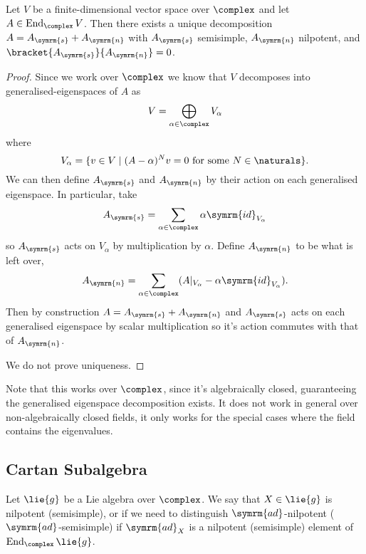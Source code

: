 \documentclass[fleqn]{NotesClass}
\newcommand{\id}{\symrm{id}}
\DeclareMathOperator{\End}{End}
\newcommand{\ad}{\symrm{ad}}
\begin{document}
    \begin{prp}{}{}
        Let \(V\) be a finite-dimensional vector space over \(\complex\) and let \(A \in \End_{\complex}V\).
        Then there exists a unique decomposition \(A = A_{\symrm{s}} + A_{\symrm{n}}\) with \(A_{\symrm{s}}\) semisimple, \(A_{\symrm{n}}\) nilpotent, and \(\bracket{A_{\symrm{s}}}{A_{\symrm{n}}} = 0\).
        \begin{proof}
            Since we work over \(\complex\) we know that \(V\) decomposes into generalised-eigenspaces of \(A\) as
            \begin{equation}
                V = \bigoplus_{\alpha \in \complex} V_\alpha
            \end{equation}
            where
            \begin{equation}
                V_\alpha = \{v \in V \mid (A - \alpha)^Nv = 0 \text{ for some } N \in \naturals\}.
            \end{equation}
            We can then define \(A_{\symrm{s}}\) and \(A_{\symrm{n}}\) by their action on each generalised eigenspace.
            In particular, take
            \begin{equation}
                A_{\symrm{s}} = \sum_{\alpha \in \complex} \alpha \id_{V_\alpha}
            \end{equation}
            so \(A_{\symrm{s}}\) acts on \(V_\alpha\) by multiplication by \(\alpha\).
            Define \(A_{\symrm{n}}\) to be what is left over,
            \begin{equation}
                A_{\symrm{n}} = \sum_{\alpha \in \complex} (A|_{V_\alpha} - \alpha \id_{V_\alpha}).
            \end{equation}
            Then by construction \(A = A_{\symrm{s}} + A_{\symrm{n}}\) and \(A_{\symrm{s}}\) acts on each generalised eigenspace by scalar multiplication so it's action commutes with that of \(A_{\symrm{n}}\).
            
            We do not prove uniqueness.
        \end{proof}
    \end{prp}
    
    Note that this works over \(\complex\), since it's algebraically closed, guaranteeing the generalised eigenspace decomposition exists.
    It does not work in general over non-algebraically closed fields, it only works for the special cases where the field contains the eigenvalues.
    
    \subsection{Cartan Subalgebra}
    \begin{dfn}{}{}
        Let \(\lie{g}\) be a Lie algebra over \(\complex\).
        We say that \(X \in \lie{g}\) is nilpotent (semisimple), or if we need to distinguish \(\ad\)-nilpotent (\(\ad\)-semisimple) if \(\ad_X\) is a nilpotent (semisimple) element of \(\End_{\complex} \lie{g}\).
    \end{dfn}
    
\end{document}
